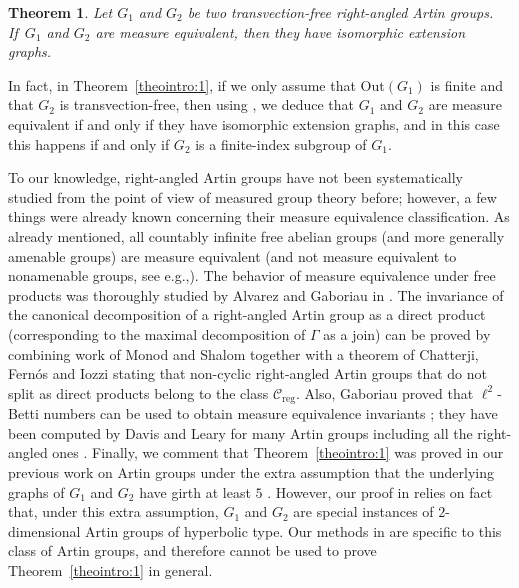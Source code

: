 \documentclass[11pt]{article}
\newcommand{\eg}{e.g.,\xspace}
\numberwithin{equation}{section}
\let\mathcal\mathscr
\theoremstyle{plain}
\newtheorem{theointro}{Theorem}
\theoremstyle{definition}
\newcommand{\Out}{\mathrm{Out}}
\begin{document}
\begin{theointro}\label{theointro:main}
Let $G_1$ and $G_2$ be two transvection-free right-angled Artin groups. If~$G_1$ and $G_2$ are measure equivalent, then they have isomorphic extension graphs.
\end{theointro}

In fact, in Theorem~\ref{theointro:1}, if we only assume that $\Out(G_1)$ is finite and that $G_2$ is transvection-free, then using \cite[Th.\,1.2]{Hua}, we deduce that $G_1$ and $G_2$ are measure equivalent if and only if they have isomorphic extension graphs, and in this case this happens if and only if $G_2$ is a finite-index subgroup of $G_1$.

To our knowledge, right-angled Artin groups have not been systematically studied from the point of view of measured group theory before; however, a few things were already known concerning their measure equivalence classification. As already mentioned, all countably infinite free abelian groups (and more generally amenable groups) are measure equivalent \cite{Dye2,OW} (and not measure equivalent to nonamenable groups, see \eg \cite[Cor.\,3.2]{Fur-survey}). The behavior of measure equivalence under free products was thoroughly studied by Alvarez and Gaboriau in \cite{AG}. The invariance of the canonical decomposition of a right-angled Artin group as a direct product (corresponding to the maximal decomposition of $\Gamma$ as a join) can be proved by combining work of Monod and Shalom \cite[Th\,1.16 \& 1.17]{MS} together with a theorem of Chatterji, Fernós and Iozzi \cite[Cor.\,1.8]{CFI} stating that non-cyclic right-angled Artin groups that do not split as direct products belong to the class $\mathcal{C}_{\mathrm{reg}}$. Also, Gaboriau proved that $\ell^2$-Betti numbers can be used to obtain measure equivalence invariants \cite{Gab-betti}; they have been computed by Davis and Leary for many Artin groups including all the right-angled ones \cite{DL}. Finally, we comment that Theorem~\ref{theointro:1} was proved in our previous work on Artin groups under the extra assumption that the underlying graphs of $G_1$ and $G_2$ have girth at least $5$ \cite[Cor.\,10.3]{HH}. However, our proof in \cite{HH} relies on fact that, under this extra assumption, $G_1$ and $G_2$ are special instances of $2$-dimensional Artin groups of hyperbolic type. Our methods in \cite{HH} are specific to this class of Artin groups, and therefore cannot be used to prove Theorem~\ref{theointro:1} in general.
\end{document}
